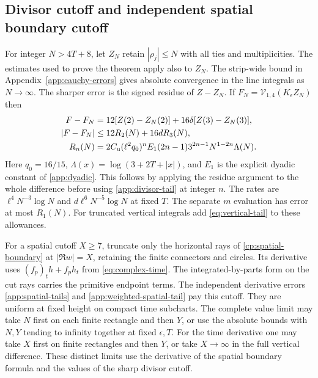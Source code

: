 \subsection{Divisor cutoff and independent spatial boundary cutoff}

For integer \(N>4T+8\), let \(Z_N\) retain \(|\rho_j|\le N\)
with all ties and multiplicities. The estimates used to prove the
theorem apply also to \(Z_N\). The strip-wide bound in
Appendix~\ref{app:cauchy-errors} gives absolute convergence in
the line integrals as \(N\to\infty\). The sharper error is the
signed residue of \(Z-Z_N\). If \(F_N=\mathcal V_{1,4}(K_\epsilon Z_N)\)
then
\begin{equation}
 \begin{aligned}
 F-F_N&=12[Z(2)-Z_N(2)]+16\delta[Z(3)-Z_N(3)],\\
 |F-F_N|&\le12R_2(N)+16d R_3(N),\\
 R_n(N)&=2C_{\mathrm u}(\ell^2q_0)^n E_1(2n-1)3^{2n-1}
                               N^{1-2n}\Lambda(N).
 \end{aligned}
 \label{cau:residue-error}
\end{equation}
Here \(q_0=16/15\), \(\Lambda(x)=\log(3+2T+|x|)\), and \(E_1\)
is the explicit dyadic constant of \eqref{app:dyadic}.
This follows by applying the residue argument to the whole
difference before using \eqref{app:divisor-tail} at integer \(n\).
The rates are \(\ell^4N^{-3}\log N\) and \(d\ell^6N^{-5}\log N\)
at fixed \(T\). The separate \(m\) evaluation has error at most
\(R_1(N)\). For truncated vertical integrals add
\eqref{eq:vertical-tail} to these allowances.

For a spatial cutoff \(X\ge7\), truncate only the horizontal rays
of \eqref{cp:spatial-boundary} at \(|\Re w|=X\), retaining the
finite connectors and circles. Its derivative uses
\((f_p)_t h+f_p h_t\) from \eqref{eq:complex-time}. The
integrated-by-parts form on the cut rays carries the primitive
endpoint terms. The independent derivative errors
\eqref{app:spatial-tails} and \eqref{app:weighted-spatial-tail}
pay this cutoff. They are uniform at fixed height on compact
time subcharts. The complete value limit may take \(N\) first
on each finite rectangle and then \(Y\), or use the absolute
bounds with \(N,Y\) tending to infinity together at fixed
\(\epsilon,T\). For the time derivative one may take \(X\) first
on finite rectangles and then \(Y\), or take \(X\to\infty\) in
the full vertical difference. These distinct limits use the
derivative of the spatial boundary formula and the values of
the sharp divisor cutoff.

